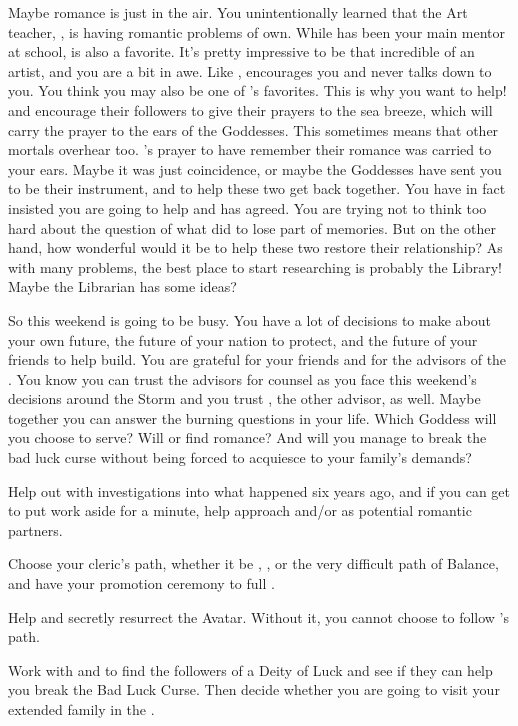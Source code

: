 \documentclass[char]{GL2020}
\begin{document}
Maybe romance is just in the air. You unintentionally learned that the Art teacher, \cChupAvenger{\intro}, is having romantic problems of \cChupAvenger{\their} own. While \cFlowPriest{} has been your main mentor at school, \cChupAvenger{} is also a favorite. It's pretty impressive to be that incredible of an artist, and you are a bit in awe. Like \cBunker{}, \cChupAvenger{} encourages you and never talks down to you. You think you may also be one of \cChupAvenger{}’s favorites. This is why you want to help! \cEbb{} and \cFlow{} encourage their followers to give their prayers to the sea breeze, which will carry the prayer to the ears of the Goddesses. This sometimes means that other mortals overhear too. \cChupAvenger{}'s prayer to have \cHeadScientist{\intro} remember their romance was carried to your ears. Maybe it was just coincidence, or maybe the Goddesses have sent you to be their instrument, and to help these two get back together. You have in fact insisted you are going to help and \cChupAvenger{} has agreed. You are trying not to think too hard about the question of what \cHeadScientist{} did to lose part of \cHeadScientist{\their} memories. But on the other hand, how wonderful would it be to help these two restore their relationship? As with many problems, the best place to start researching is probably the Library! Maybe the Librarian \cLibrarian{\intro} has some ideas?

So this weekend is going to be busy. You have a lot of decisions to make about your own future, the future of your nation to protect, and the future of your friends to help build. You are grateful for your friends and for the advisors of the \pShip{}. You know you can trust the \pShippie{} advisors for counsel as you face this weekend’s decisions around the Storm and you trust \cChupLeader{\intro}, the other advisor, as well. Maybe together you can answer the burning questions in your life. Which Goddess will you choose to serve? Will \cPresident{} or \cChupAvenger{} find romance? And will you manage to break the bad luck curse without being forced to acquiesce to your \pFarm{} family's demands?

\begin{itemz}
    \item Help \cPresident{} out with \cPresident{\their} investigations into what happened six years ago, and if you can get \cPresident{\them} to put work aside for a minute, help \cPresident{\them} approach \cHeir{} and/or \cChupStudent{} as potential romantic partners.
    \item Choose your cleric's path, whether it be \cEbbFull{\full}, \cFlowFull{\full}, or the very difficult path of Balance, and have your promotion ceremony to full \cInitiate{\cleric}.
    \item Help \cFlowPriest{} and \cEbbPriest{} secretly resurrect the \cEbb{} Avatar. Without it, you cannot choose to follow \cEbb{}'s path.
    \item Work with \cPresident{} and \cWarlordDaughter{} to find the followers of a Deity of Luck and see if they can help you break the Bad Luck Curse. Then decide whether you are going to visit your extended family in the \pFarm{}.
\end{itemz}
\end{document}
